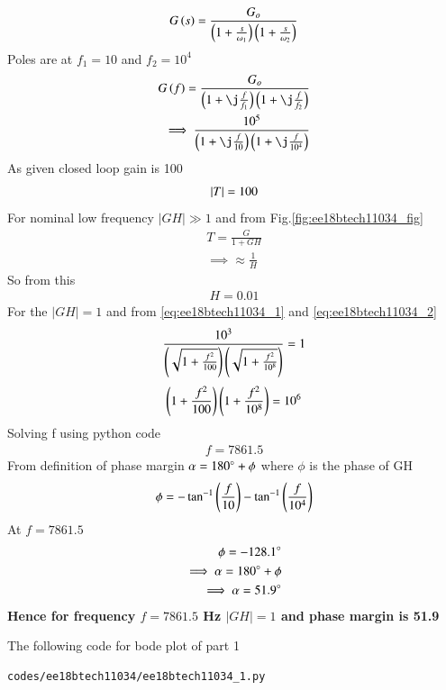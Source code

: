 \begin{enumerate}[label=\thesubsection.\arabic*.,ref=\thesubsection.\theenumi]
\begin{align}
    G\left(s\right) = \frac{G_{o}}{\left(1+\frac{s}{\omega_{1}}\right)\left(1+\frac{s}{\omega_{2}}\right)}
\end{align}
Poles are at $f_{1} =10$ and $f_{2} = 10^{4}$
\begin{align}
G\brak{f} = \frac{G_{o}}{\brak{1+\j\frac{f}{f_{1}}}\brak{1+\j\frac{f}{f_{2}}}}
\\
\implies \frac{10^{5}}{\brak{1+\j\frac{f}{10}}\brak{1+\j\frac{f}{10^{4}}}}
\label{eq:ee18btech11034_1}
\end{align}
As given closed loop gain is 100
\begin{align}
    \left\vert T\right\vert = 100
\end{align}
For nominal low frequency $|GH| \gg 1$ and from Fig.\ref{fig:ee18btech11034_fig}
\begin{align}
    T = \frac{G}{1+GH}
    \\
\implies \approx \frac{1}{H}
\end{align}
So from this 
\begin{align}
    H = 0.01
    \label{eq:ee18btech11034_2}
\end{align}
For the $|GH| = 1$ and from \eqref{eq:ee18btech11034_1} and \eqref{eq:ee18btech11034_2}
\begin{align}
   \frac{10^{3}}{\left(\sqrt{1+\frac{f^2}{100}}\right)\left(\sqrt{1+\frac{f^2}{10^{8}}}\right)} = 1
\end{align}
\begin{align}
    \left(1+\frac{f^2}{100}\right)\left(1+\frac{f^2}{10^{8}}\right) = 10^{6}
\end{align}
Solving f using python code  
\begin{align}
    f = 7861.5 
\end{align}
From definition of phase margin $\alpha = 180\degree + \phi$
where $\phi$ is the phase of GH
\begin{align}
\phi = -\tan^{-1}\brak{\frac{f}{10}} -\tan^{-1}\brak{\frac{f}{10^{4}}}
\label{eq:ee18btech11034_phaseGH}
\end{align}
At $f = 7861.5$
\begin{align}
    \phi = -128.1\degree
    \\
    \implies \alpha = 180\degree + \phi
    \label{eq:ee18btech11034_3}
    \\
    \implies \alpha = 51.9\degree
\end{align}
\textbf{Hence for frequency $f = 7861.5$ Hz $|GH| = 1$ and phase margin is 51.9\degree}

The following code for bode plot of part 1
\begin{lstlisting}
codes/ee18btech11034/ee18btech11034_1.py
\end{lstlisting}


\end{enumerate}
